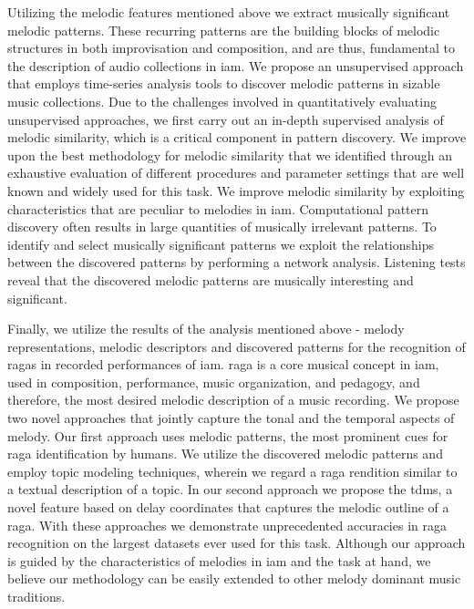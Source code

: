 Utilizing the melodic features mentioned above we extract musically significant melodic patterns. These recurring patterns are the building blocks of melodic structures in both improvisation and composition, and are thus, fundamental to the description of audio collections in \gls{iam}. We propose an unsupervised approach that employs time-series analysis tools to discover melodic patterns in sizable music collections. Due to the challenges involved in quantitatively evaluating unsupervised approaches, we first carry out an in-depth supervised analysis of  melodic similarity, which is a critical component in pattern discovery. We improve upon the best methodology for melodic similarity that we identified through an exhaustive evaluation of different procedures and parameter settings that are well known and widely used for this task. We improve melodic similarity by exploiting characteristics that are peculiar to melodies in \gls{iam}. Computational pattern discovery often results in large quantities of musically irrelevant patterns. To identify and select musically significant patterns we exploit the relationships between the discovered patterns by performing a network analysis. Listening tests reveal that the discovered melodic patterns are musically interesting and significant.

Finally, we utilize the results of the analysis  mentioned above - melody representations, melodic descriptors and discovered patterns for the recognition of \glspl{raga} in recorded performances of \gls{iam}. \Gls{raga} is a core musical concept in \gls{iam}, used in composition, performance, music organization, and pedagogy, and therefore, the most desired melodic description of a music recording. We propose two novel approaches that jointly capture the tonal and the temporal aspects of melody. Our first approach uses melodic patterns, the most prominent cues for \gls{raga} identification by humans. We utilize the discovered melodic patterns and employ topic modeling techniques, wherein we regard a \gls{raga} rendition similar to a textual description of a topic. In our second approach we propose the \gls{tdms}, a novel feature based on delay coordinates that captures the melodic outline of a \gls{raga}. With these approaches we demonstrate unprecedented accuracies in \gls{raga} recognition on the largest datasets ever used for this task.  Although our approach is guided by the characteristics of melodies in \gls{iam} and the task at hand, we believe our methodology can be easily extended to other melody dominant music traditions.

